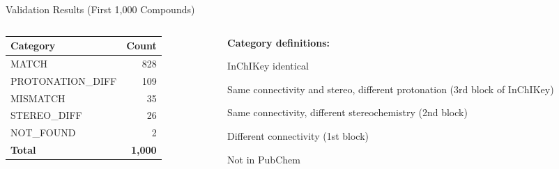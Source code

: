 \documentclass[aspectratio=169,11pt]{beamer}
\begin{document}
\begin{frame}{Validation Results (First 1,000 Compounds)}

\begin{columns}[T]
\begin{column}{0.45\textwidth}
\begin{table}[h]
\centering
\begin{tabular}{lr}
\toprule
\textbf{Category} & \textbf{Count} \\
\midrule
MATCH              & 828 \\
PROTONATION\_DIFF  & 109 \\
MISMATCH           &  35 \\
STEREO\_DIFF       &  26 \\
NOT\_FOUND         &   2 \\
\midrule
\textbf{Total}     & \textbf{1,000} \\
\bottomrule
\end{tabular}
\end{table}
\end{column}

\begin{column}{0.50\textwidth}
\textbf{Category definitions:}
\begin{description}\footnotesize
  \item[MATCH] InChIKey identical
  \item[PROTONATION\_DIFF] Same connectivity and stereo, different protonation
        (3rd block of InChIKey)
  \item[STEREO\_DIFF] Same connectivity, different stereochemistry
        (2nd block)
  \item[MISMATCH] Different connectivity (1st block)
  \item[NOT\_FOUND] Not in PubChem
\end{description}
\end{column}
\end{columns}

\end{frame}
\end{document}
